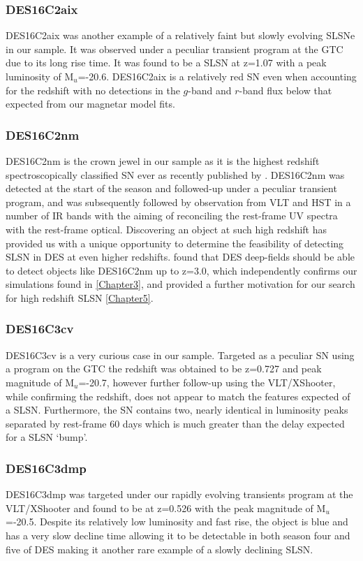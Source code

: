 \subsubsection{DES16C2aix}
DES16C2aix was another example of a relatively faint but slowly evolving SLSNe in our sample. It was observed under a peculiar transient program at the GTC due to its long rise time. It was found to be a SLSN at z=1.07 with a peak luminosity of M$_u$=-20.6. DES16C2aix is a relatively red SN even when accounting for the redshift with no detections in the $g$-band and $r$-band flux below that expected from our magnetar model fits.

\subsubsection{DES16C2nm}
DES16C2nm is the crown jewel in our sample as it is the highest redshift spectroscopically classified SN ever as recently published by \citet{Smith2018}. DES16C2nm was detected at the start of the season and followed-up under a peculiar transient program, and was subsequently followed by observation from VLT and HST in a number of IR bands with the aiming of reconciling the rest-frame UV spectra with the rest-frame optical. Discovering an object at such high redshift has provided us with a unique opportunity to determine the feasibility of detecting SLSN in DES at even higher redshifts. \citet{Smith2018} found that DES deep-fields should be able to detect objects like DES16C2nm up to z=3.0, which independently confirms our simulations found in \cref{Chapter3}, and provided a further motivation for our search for high redshift SLSN \cref{Chapter5}.

\subsubsection{DES16C3cv}
DES16C3cv is a very curious case in our sample. Targeted as a peculiar SN using a program on the GTC the redshift was obtained to be z=0.727 and peak magnitude of M$_u$=-20.7, however further follow-up using the VLT/XShooter, while confirming the redshift, does not appear to match the features expected of a SLSN. Furthermore, the SN contains two, nearly identical in luminosity peaks separated by rest-frame 60 days which is much greater than the delay expected for a SLSN `bump'.

\subsubsection{DES16C3dmp}
DES16C3dmp was targeted under our rapidly evolving transients program at the VLT/XShooter and found to be at z=0.526 with the peak magnitude of M$_u$=-20.5. Despite its relatively low luminosity and fast rise, the object is blue and has a very slow decline time allowing it to be detectable in both season four and five of DES making it another rare example of a slowly declining SLSN.

